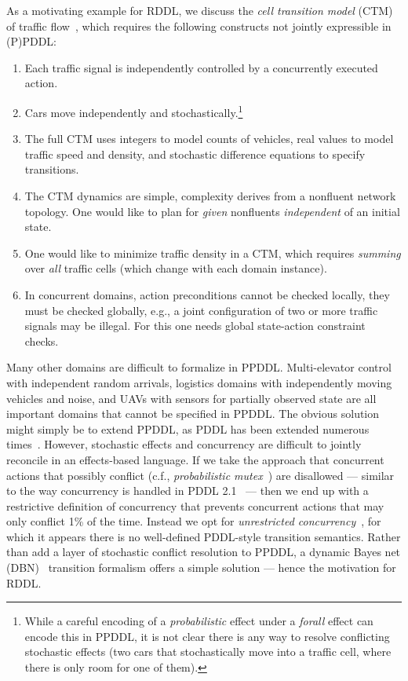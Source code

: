 \documentclass[11pt,a4paper]{article}
\begin{document}
As a motivating example for RDDL, we discuss the \emph{cell transition
model} (CTM) of traffic flow~\cite{ctm}, which requires the following
constructs not jointly expressible in (P)PDDL:
\begin{enumerate}
\item Each traffic signal is independently controlled by a concurrently executed action.
\item Cars move independently and stochastically.\footnote{While a careful
encoding of a \emph{probabilistic} effect under a \emph{forall} effect
can encode this in PPDDL, it is not clear there is any way to resolve
conflicting stochastic effects (two cars that stochastically move into
a traffic cell, where there is only room for one of them).}
\item The full CTM uses integers to model counts of vehicles,
real values to model traffic speed and density, and stochastic
difference equations to specify transitions.
\item The CTM dynamics are simple, complexity derives
from a nonfluent network topology.  One would like to plan
for \emph{given} nonfluents \emph{independent} of an initial state.
\item One would like to minimize traffic density in a CTM, which requires
\emph{summing} over \emph{all} traffic cells (which change with each domain instance).
\item In concurrent domains, action preconditions cannot be checked
locally, they must be checked globally, e.g., a joint configuration of
two or more traffic signals may be illegal.  For this one needs global
state-action constraint checks.
\end{enumerate}

Many other domains are difficult to formalize in PPDDL.
Multi-elevator control with independent random arrivals, logistics
domains with independently moving vehicles and noise, and UAVs with
sensors for partially observed state are all important domains that
cannot be specified in PPDDL.  The obvious solution might simply be to
extend PPDDL, as PDDL has been extended numerous
times~\cite{pddl_family}.  However, stochastic effects and concurrency
are difficult to jointly reconcile in an effects-based language.  If we
take the approach that concurrent actions that possibly conflict
(c.f., \emph{probabilistic mutex}~\cite{pgraphplan}) are disallowed
--- similar to the way concurrency is handled in PDDL
2.1~\cite{pddl21} --- then we end up with a restrictive definition of
concurrency that prevents concurrent actions that may only conflict
1\% of the time.  Instead we opt for \emph{unrestricted
concurrency}~\cite{paragraph}, for which it appears there is no 
well-defined PDDL-style transition semantics.  Rather than add a layer of
stochastic conflict resolution to PPDDL, a dynamic Bayes net
(DBN)~\cite{dbn} transition formalism offers a simple solution --- hence
the motivation for RDDL.
\end{document}
